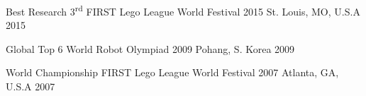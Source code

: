 



\begin{cvhonors}

  \cvhonor
    {Best Research 3\textsuperscript{rd}} %
    {FIRST Lego League World Festival 2015} %
    {St. Louis, MO, U.S.A} %
    {2015} %

  \cvhonor
    {Global Top 6} %
    {World Robot Olympiad 2009} %
    {Pohang, S. Korea} %
    {2009} %
    
  \cvhonor
    {World Championship} %
    {FIRST Lego League World Festival 2007} %
    {Atlanta, GA, U.S.A} %
    {2007} %

\end{cvhonors}




